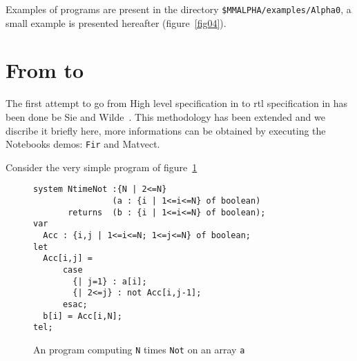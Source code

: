 Examples of {\AlphaZ} programs are present in the directory 
{\tt \$MMALPHA/examples/Alpha0}, a small example is presented hereafter
 (figure~\ref{fig04}).

\section{From {\Alpha} to {\AlphaZ}}
The first attempt to go from High level specification in {\Alpha}
to {\sc rtl} specification in {} has been done be Sie and 
Wilde~\cite{SieWilde94}. This methodology has been 
extended and we discribe it briefly here, more informations
can be obtained by executing the Notebooks demos: {\tt Fir} and {Matvect}.

Consider the very simple program of figure~\ref{fig01}

{\small
\begin{figure}[h]
\begin{verbatim}
system NtimeNot :{N | 2<=N}
                (a : {i | 1<=i<=N} of boolean)
       returns  (b : {i | 1<=i<=N} of boolean);
var
  Acc : {i,j | 1<=i<=N; 1<=j<=N} of boolean;
let
  Acc[i,j] = 
      case
        {| j=1} : a[i];
        {| 2<=j} : not Acc[i,j-1];
      esac;
  b[i] = Acc[i,N];
tel;
\end{verbatim}
\caption{An {\Alpha} program computing {\tt N} times {\tt Not} 
on an array {\tt a}}
\label{fig01}
\end{figure}
}

